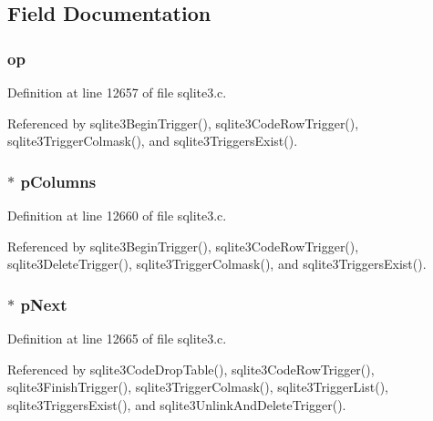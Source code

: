\subsection{Field Documentation}
\hypertarget{struct_trigger_a0991b29aa40e12f033237266ebe6610c}{}
\subsubsection[{op}]{ op}\label{struct_trigger_a0991b29aa40e12f033237266ebe6610c}


Definition at line 12657 of file sqlite3.\+c.



Referenced by sqlite3\+Begin\+Trigger(), sqlite3\+Code\+Row\+Trigger(), sqlite3\+Trigger\+Colmask(), and sqlite3\+Triggers\+Exist().

\hypertarget{struct_trigger_a3c7046da4f11b74f98e0611dac37d586}{}
\subsubsection[{p\+Columns}]{$\ast$ p\+Columns}\label{struct_trigger_a3c7046da4f11b74f98e0611dac37d586}


Definition at line 12660 of file sqlite3.\+c.



Referenced by sqlite3\+Begin\+Trigger(), sqlite3\+Code\+Row\+Trigger(), sqlite3\+Delete\+Trigger(), sqlite3\+Trigger\+Colmask(), and sqlite3\+Triggers\+Exist().

\hypertarget{struct_trigger_a2729170b472b9b62b8c6a558d58d6819}{}
\subsubsection[{p\+Next}]{$\ast$ p\+Next}\label{struct_trigger_a2729170b472b9b62b8c6a558d58d6819}


Definition at line 12665 of file sqlite3.\+c.



Referenced by sqlite3\+Code\+Drop\+Table(), sqlite3\+Code\+Row\+Trigger(), sqlite3\+Finish\+Trigger(), sqlite3\+Trigger\+Colmask(), sqlite3\+Trigger\+List(), sqlite3\+Triggers\+Exist(), and sqlite3\+Unlink\+And\+Delete\+Trigger().

